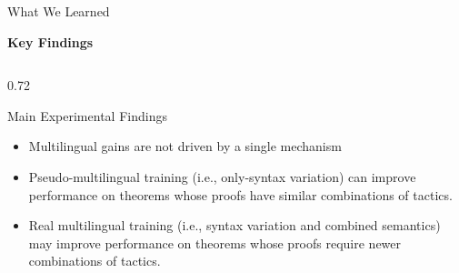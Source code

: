 \documentclass[aspectratio=169]{beamer}
\begin{document}
\begin{frame}{What We Learned}

\centering

{\LARGE \textbf{Key Findings}}

\vspace{0.5cm}

\begin{columns}[T,onlytextwidth]

\begin{column}{0.72\textwidth}

\begin{block}{Main Experimental Findings}

\vspace{0.15cm}

\begin{itemize}
    \item Multilingual gains are not driven by a single mechanism
    \vspace{0.18cm}

    \item Pseudo-multilingual training  (i.e., only-syntax variation) can improve performance on theorems whose proofs have similar combinations of tactics.
    \vspace{0.18cm}

    \item Real multilingual training (i.e., syntax variation and combined semantics) may improve performance on theorems whose proofs require newer combinations of tactics.
\end{itemize}

\end{block}

\end{column}

\end{columns}

\end{frame}
\end{document}
